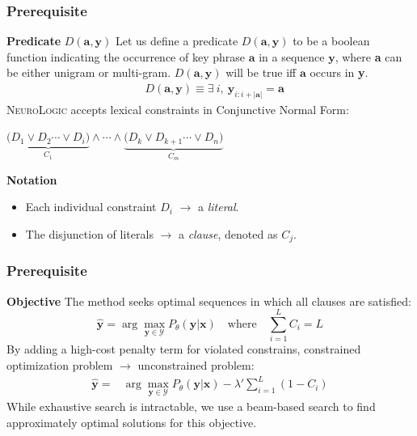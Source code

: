 \documentclass[10pt,aspectratio=43]{beamer}
\newcommand{\methodshort}{\frenchspacing\textsc{NeuroLogic}\xspace}
\begin{document}
    \begin{frame}
        \frametitle{\textbf{Prerequisite}}
        \begin{block}{\textbf{Predicate} $D(\textbf{a}, \textbf{y})$}
            Let us define a predicate $D(\textbf{a}, \textbf{y})$ to be a boolean function indicating the occurrence of key phrase $\textbf{a}$ in a sequence $\textbf{y}$, where \textbf{a} can be either unigram or multi-gram. $D(\textbf{a}, \textbf{y})$ will be true iff $\textbf{a}$ occurs in \textbf{y}.
            \begin{align*}
                &D(\textbf{a}, \textbf{y}) \equiv \exists \: i, \> \textbf{y}_{i:i+|\textbf{a}|} = \textbf{a}
            \end{align*}
            \methodshort{}  accepts lexical constraints in Conjunctive Normal Form:
            \begin{center}
                $\underbrace{\big(D_1 \lor D_2 \cdots \lor D_i \big)}_{C_1}\land \cdots \land \underbrace{\big(D_k \lor D_{k+1} \cdots \lor D_n \big)}_{C_m}$
            \end{center}
        \end{block}
        \begin{block}{\textbf{Notation}}
            \begin{itemize}
                \item Each individual constraint $D_{i}$ $\rightarrow$ a \emph{literal}.
                \item The disjunction of literals $\rightarrow$ a \emph{clause}, denoted as $C_{j}$.
            \end{itemize}
        \end{block}
    \end{frame}
    
    \begin{frame}
        \frametitle{\textbf{Prerequisite}}
        \begin{block}{\textbf{Objective}}
            The method seeks optimal sequences in which all clauses are satisfied:
            \begin{equation}
                \hat{\textbf{y}} {=} \arg\max_{\textbf{y} \in \mathcal{Y}}P_\theta(\textbf{y}|\textbf{x}) \hspace{1em}\textrm{where}\hspace{1em} \sum_{i=1}^{L} C_i{=}L
             \end{equation}
            By adding a high-cost penalty term for violated constrains, constrained optimization problem $\rightarrow$ unconstrained problem:
            \begin{align}
                \hat{\textbf{y}} = &\arg\max_{\textbf{y} \in \mathcal{Y}}P_\theta(\textbf{y}|\textbf{x}) - \lambda' \sum_{i=1}^{L} (1-C_i)
             \end{align}
            While exhaustive search is intractable, we use a beam-based search to find approximately optimal solutions for this objective.
        \end{block}
    \end{frame}
    
\end{document}
